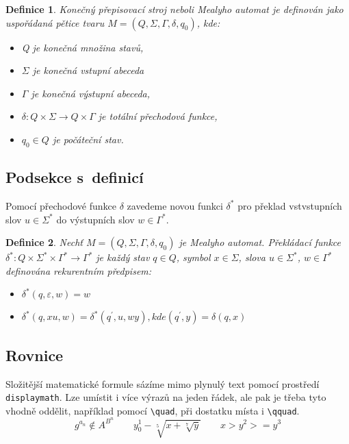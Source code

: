 \documentclass[twocolumn,11pt]{article}
\newtheorem{theorem}{Definice}
\begin{document}
\begin{theorem}\label{def:first}
\emph{Konečný přepisovací stroj} neboli \emph{Mea\-ly\-ho automat} je definován jako uspořádaná pětice tvaru $M = (Q,\varSigma, \varGamma, \delta, q_0)$, kde:
\begin{itemize}
    \item Q je konečná množina \emph{stavů},
    \item $\varSigma$ je konečná \emph{vstupní abeceda}
    \item $\varGamma$ je konečná \emph{výstupní abeceda},
    \item $\delta:Q \times \varSigma \rightarrow Q \times \varGamma$ je totální přechodová funkce,
    \item $q_0 \in Q$ je \emph{počáteční stav}.
\end{itemize}
\end{theorem}
\subsection{Podsekce s~definicí}
Pomocí přechodové funkce $\delta$ zavedeme novou funkci $\delta^\ast$ pro překlad vstvstupních slov $u \in \varSigma^\ast$ do výstupních slov $w \in \varGamma^\ast$.

\begin{theorem}
Nechť $M=(Q,\varSigma,\varGamma,\delta,q_0)$ je Mealyho automat. \emph{Překládací funkce} $\delta^\ast:Q\times\varSigma^\ast \times \varGamma^\ast \rightarrow \varGamma^\ast$ je každý stav $q \in Q$, symbol $x \in \varSigma$, slova $u \in \varSigma^\ast$, $w \in \varGamma^\ast$ definována rekurentním předpisem:
\begin{itemize}
    \item $\delta^\ast(q,\varepsilon,w)= w$
    \item $\delta^\ast(q,xu,w)= \delta^\ast(q^\prime,u,wy), kde (q^\prime,y) = \delta(q,x)$
\end{itemize}
\end{theorem}

\subsection{Rovnice}
Složitější matematické formule sázíme mimo plynulý text pomocí prostředí \texttt{displaymath}. Lze umístit i více výrazů na jeden řádek, ale pak je třeba tyto vhodně oddělit, například pomocí \verb|\quad|, při dostatku místa i \verb|\qquad|.
\begin{displaymath}
    g^{a_n} \notin A^{B^n} \qquad y_0^1-\sqrt[5]{x+\sqrt[7]{y}} \qquad x > y^2 >= y^3 
\end{displaymath}
\end{document}

